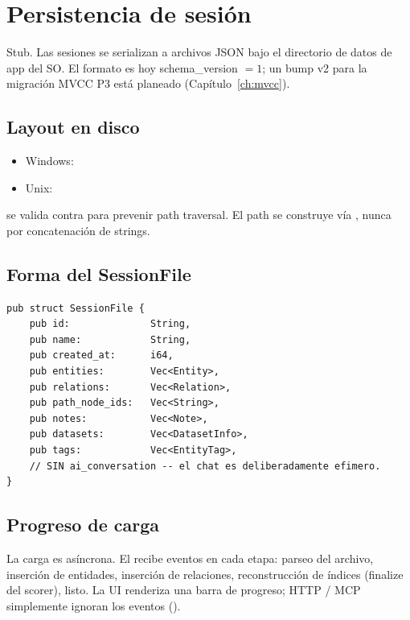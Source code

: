 \chapter{Persistencia de sesión}
\label{ch:persistence}

\begin{note}
Stub. Las sesiones se serializan a archivos JSON bajo el
directorio de datos de app del SO. El formato es hoy
schema\_version $= 1$; un bump v2 para la migración MVCC P3
está planeado (Capítulo~\ref{ch:mvcc}).
\end{note}

\section{Layout en disco}

\begin{itemize}
    \item Windows: 
    \item Unix: 
\end{itemize}

 se valida contra 
para prevenir path traversal. El path se construye vía
, nunca por concatenación de strings.

\section{Forma del SessionFile}

\begin{lstlisting}[style=rust]
pub struct SessionFile {
    pub id:              String,
    pub name:            String,
    pub created_at:      i64,
    pub entities:        Vec<Entity>,
    pub relations:       Vec<Relation>,
    pub path_node_ids:   Vec<String>,
    pub notes:           Vec<Note>,
    pub datasets:        Vec<DatasetInfo>,
    pub tags:            Vec<EntityTag>,
    // SIN ai_conversation -- el chat es deliberadamente efimero.
}
\end{lstlisting}

\section{Progreso de carga}

La carga es asíncrona. El  recibe eventos
 en cada etapa: parseo del archivo,
inserción de entidades, inserción de relaciones, reconstrucción
de índices (finalize del scorer), listo. La UI renderiza una
barra de progreso; HTTP / MCP simplemente ignoran los eventos
().

